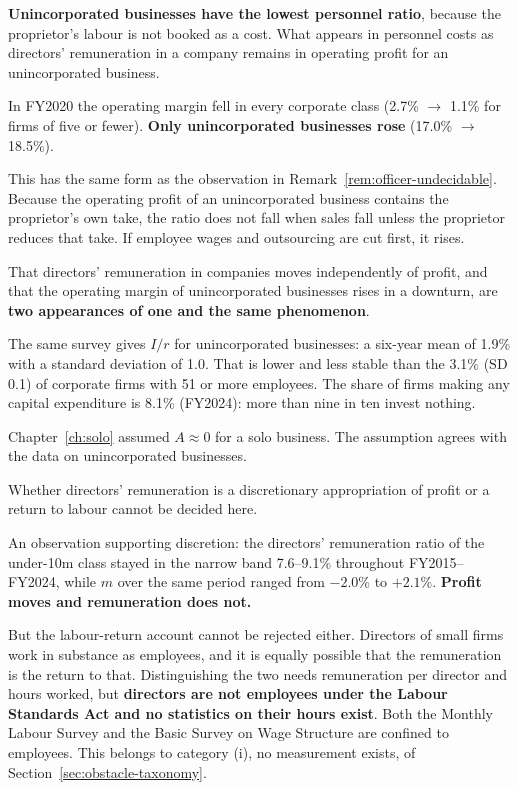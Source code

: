 \textbf{Unincorporated businesses have the lowest personnel ratio}, because the proprietor's
labour is not booked as a cost. What appears in personnel costs as directors' remuneration in
a company remains in operating profit for an unincorporated business.

\begin{remark}
\label{rem:covid-reversal}
In FY2020 the operating margin fell in every corporate class (2.7\% $\to$ 1.1\% for firms of
five or fewer). \textbf{Only unincorporated businesses rose} (17.0\% $\to$ 18.5\%).

This has the same form as the observation in Remark~\ref{rem:officer-undecidable}. Because
the operating profit of an unincorporated business contains the proprietor's own take, the
ratio does not fall when sales fall unless the proprietor reduces that take. If employee
wages and outsourcing are cut first, it rises.

That directors' remuneration in companies moves independently of profit, and that the
operating margin of unincorporated businesses rises in a downturn, are
\textbf{two appearances of one and the same phenomenon}.
\end{remark}

\begin{remark}
\label{rem:individual-capex}
The same survey gives $I/r$ for unincorporated businesses: a six-year mean of 1.9\% with a
standard deviation of 1.0. That is lower and less stable than the 3.1\% (SD 0.1) of corporate
firms with 51 or more employees. The share of firms making any capital expenditure is 8.1\%
(FY2024): more than nine in ten invest nothing.

Chapter~\ref{ch:solo} assumed $A\approx 0$ for a solo business. The assumption agrees with
the data on unincorporated businesses.
\end{remark}

\begin{remark}
\label{rem:officer-undecidable}
Whether directors' remuneration is a discretionary appropriation of profit or a return to
labour cannot be decided here.

An observation supporting discretion: the directors' remuneration ratio of the under-10m
class stayed in the narrow band 7.6--9.1\% throughout FY2015--FY2024, while $m$ over the same
period ranged from $-2.0\%$ to $+2.1\%$.
\textbf{Profit moves and remuneration does not.}

But the labour-return account cannot be rejected either. Directors of small firms work in
substance as employees, and it is equally possible that the remuneration is the return to
that. Distinguishing the two needs remuneration per director and hours worked, but
\textbf{directors are not employees under the Labour Standards Act and no statistics on their
hours exist}. Both the Monthly Labour Survey and the Basic Survey on Wage Structure are
confined to employees. This belongs to category (i), no measurement exists, of
Section~\ref{sec:obstacle-taxonomy}.
\end{remark}

